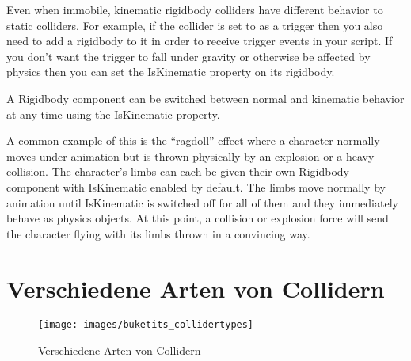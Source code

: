 Even when immobile, kinematic rigidbody colliders have different behavior to static colliders. For example, if the collider is set to as a trigger then you also need to add a rigidbody to it in order to receive trigger events in your script. If you don’t want the trigger to fall under gravity or otherwise be affected by physics then you can set the IsKinematic property on its rigidbody.

A Rigidbody component can be switched between normal and kinematic behavior at any time using the IsKinematic property.

A common example of this is the “ragdoll” effect where a character normally moves under animation but is thrown physically by an explosion or a heavy collision. The character’s limbs can each be given their own Rigidbody component with IsKinematic enabled by default. The limbs move normally by animation until IsKinematic is switched off for all of them and they immediately behave as physics objects. At this point, a collision or explosion force will send the character flying with its limbs thrown in a convincing way.
\cite{_staticCollider}

\section{Verschiedene Arten von Collidern}

\begin{figure}[h]
	\centering
	\texttt{[image: images/buketits\_collidertypes]}
	\caption{Verschiedene Arten von Collidern}
\end{figure}
\cite{dickinson2015unity}